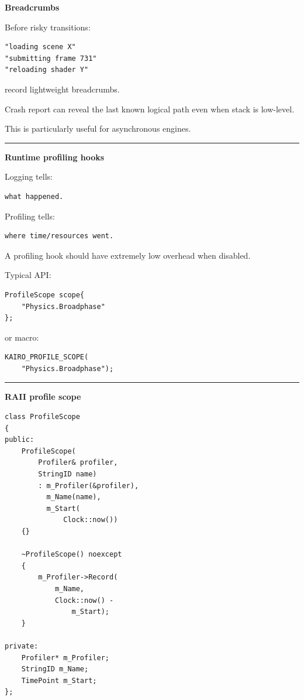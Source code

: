 \textbf{Breadcrumbs}

Before risky transitions:

\begin{verbatim}
"loading scene X"
"submitting frame 731"
"reloading shader Y"
\end{verbatim}

record lightweight breadcrumbs.

Crash report can reveal the last known logical path even when stack is low-level.

This is particularly useful for asynchronous engines.

\begin{center}\rule{0.5\linewidth}{0.5pt}\end{center}

\textbf{Runtime profiling hooks}

Logging tells:

\begin{verbatim}
what happened.
\end{verbatim}

Profiling tells:

\begin{verbatim}
where time/resources went.
\end{verbatim}

A profiling hook should have extremely low overhead when disabled.

Typical API:

\begin{verbatim}
ProfileScope scope{
    "Physics.Broadphase"
};
\end{verbatim}

or macro:

\begin{verbatim}
KAIRO_PROFILE_SCOPE(
    "Physics.Broadphase");
\end{verbatim}

\begin{center}\rule{0.5\linewidth}{0.5pt}\end{center}

\textbf{RAII profile scope}

\begin{verbatim}
class ProfileScope
{
public:
    ProfileScope(
        Profiler& profiler,
        StringID name)
        : m_Profiler(&profiler),
          m_Name(name),
          m_Start(
              Clock::now())
    {}

    ~ProfileScope() noexcept
    {
        m_Profiler->Record(
            m_Name,
            Clock::now() -
                m_Start);
    }

private:
    Profiler* m_Profiler;
    StringID m_Name;
    TimePoint m_Start;
};
\end{verbatim}

